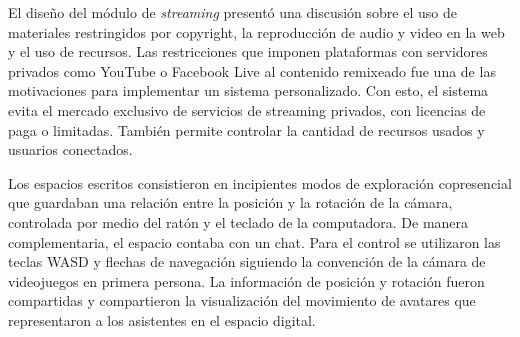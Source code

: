 El diseño del módulo de \emph{streaming} presentó una discusión sobre el uso de materiales restringidos por copyright, la reproducción de audio y video en la web y el uso de recursos. Las restricciones que imponen plataformas con servidores privados como YouTube o Facebook Live al contenido remixeado fue una de las motivaciones para implementar un sistema personalizado. Con esto, el sistema evita el mercado exclusivo de servicios de streaming privados, con licencias de paga o limitadas. También permite controlar la cantidad de recursos usados y usuarios conectados. 




Los espacios escritos consistieron en incipientes modos de exploración copresencial que guardaban una relación entre la posición y la rotación de la cámara, controlada por medio del ratón y el teclado de la computadora. De manera complementaria, el espacio contaba con un chat. Para el control se utilizaron las teclas WASD y flechas de navegación siguiendo la convención de la cámara de videojuegos en primera persona. La información de posición y rotación fueron compartidas y compartieron la visualización del movimiento de avatares que representaron a los asistentes en el espacio digital. 

